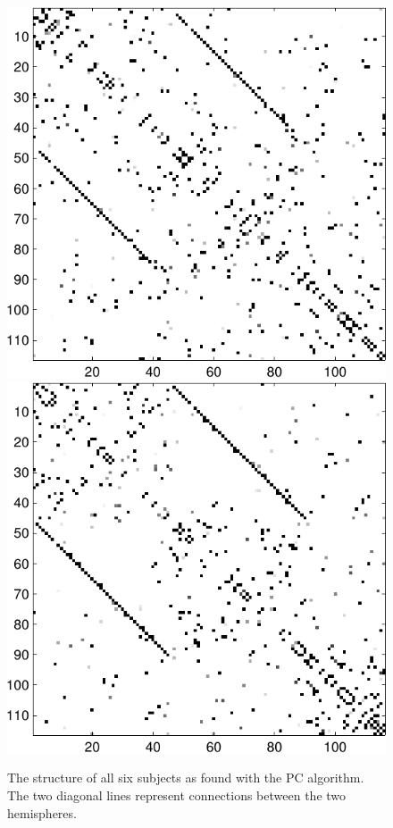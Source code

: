 \documentclass[a4paper, english]{article}
\begin{document}
\begin{figure}[h!]
\begin{minipage}[t]{1.2\textwidth}
  \includegraphics[height=0.29\textheight]{images/new/struct_subj5-crop}
  \includegraphics[height=0.29\textheight]{images/new/struct_subj6-crop}
  \end{minipage}
\caption{The structure of all six subjects as found with the PC algorithm. The two diagonal lines represent connections between the two hemispheres.}

\label{fig:struct_subjects}
\end{figure}
\end{document}
